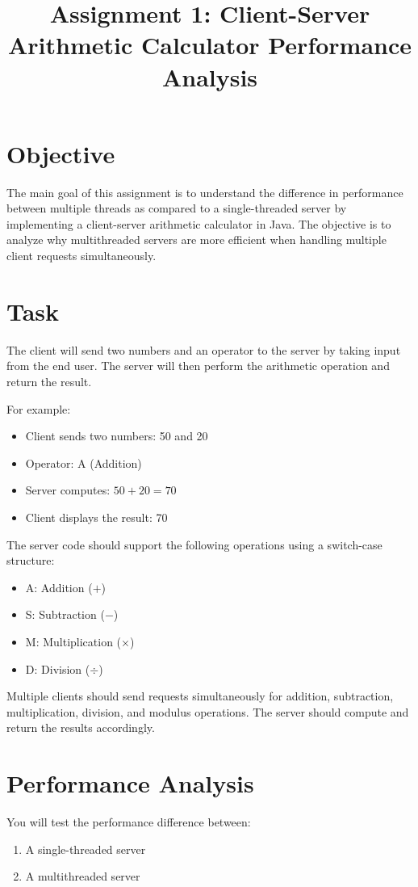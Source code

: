 \documentclass{article}
\begin{document}
\title{Assignment 1: Client-Server Arithmetic Calculator Performance Analysis}
\author{}
\date{}
\maketitle

\section{Objective}
The main goal of this assignment is to understand the difference in performance between multiple threads as compared to a single-threaded server by implementing a client-server arithmetic calculator in Java. The objective is to analyze why multithreaded servers are more efficient when handling multiple client requests simultaneously.

\section{Task}
The client will send two numbers and an operator to the server by taking input from the end user. The server will then perform the arithmetic operation and return the result. 

For example:
\begin{itemize}
    \item Client sends two numbers: 50 and 20
    \item Operator: A (Addition)
    \item Server computes: $50 + 20 = 70$
    \item Client displays the result: 70
\end{itemize}

The server code should support the following operations using a switch-case structure:
\begin{itemize}
    \item A: Addition ($+$)
    \item S: Subtraction ($-$)
    \item M: Multiplication ($\times$)
    \item D: Division ($\div$)
\end{itemize}

Multiple clients should send requests simultaneously for addition, subtraction, multiplication, division, and modulus operations. The server should compute and return the results accordingly.

\section{Performance Analysis}
You will test the performance difference between:
\begin{enumerate}
    \item A single-threaded server
    \item A multithreaded server
\end{enumerate}
\end{document}
